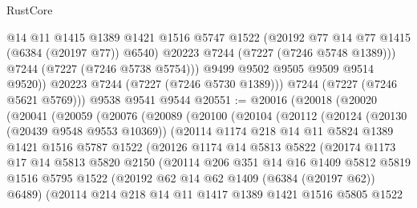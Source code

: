 \begin{lexlean}{RustCore}
\begin{coremodule}
                @14
                @11
                @1415
                @1389
                @1421
                @1516
                @5747
                @1522
                (@20192 @77 @14 @77 @1415 (@6384 (@20197 @77)) @6540)
                @20223
                @7244
                (@7227 (@7246 @5748 @1389)))
              @7244
              (@7227 (@7246 @5738 @5754)))
            @9499
            @9502
            @9505
            @9509
            @9514
            @9520))
        @20223
        @7244
        (@7227 (@7246 @5730 @1389)))
      @7244
      (@7227 (@7246 @5621 @5769)))
    @9538
    @9541
    @9544
@20551 := @20016
    (@20018
      (@20020
        (@20041
          (@20059
            (@20076
              (@20089
                (@20100
                  (@20104
                    (@20112
                      (@20124
                        (@20130 (@20439 @9548 @9553 @10369))
                        (@20114
                          @1174
                          @218
                          @14
                          @11
                          @5824
                          @1389
                          @1421
                          @1516
                          @5787
                          @1522
                          (@20126
                            @1174
                            @14
                            @5813
                            @5822
                            (@20174
                              @1173
                              @17
                              @14
                              @5813
                              @5820
                              @2150
                              (@20114
                                @206
                                @351
                                @14
                                @16
                                @1409
                                @5812
                                @5819
                                @1516
                                @5795
                                @1522
                                (@20192 @62 @14 @62 @1409 (@6384 (@20197 @62)) @6489)
                                (@20114
                                  @214
                                  @218
                                  @14
                                  @11
                                  @1417
                                  @1389
                                  @1421
                                  @1516
                                  @5805
                                  @1522

\end{coremodule}
\end{lexlean}
